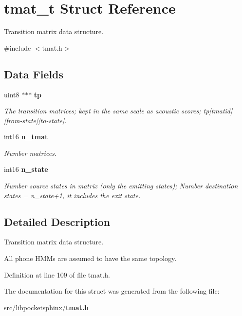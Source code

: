 \section{tmat\-\_\-t Struct Reference}
\label{structtmat__t}


Transition matrix data structure.  




{\ttfamily \#include $<$tmat.\-h$>$}

\subsection*{Data Fields}
\begin{DoxyCompactItemize}
\item 
uint8 $\ast$$\ast$$\ast$ {\bf tp}\label{structtmat__t_a9f518c96b30dab9efdb69bd779a7b5bf}

\begin{DoxyCompactList}\small\item\em The transition matrices; kept in the same scale as acoustic scores; tp[tmatid][from-\/state][to-\/state]. \end{DoxyCompactList}\item 
int16 {\bf n\-\_\-tmat}\label{structtmat__t_ada644af34d54256f1574870d5f7a6788}

\begin{DoxyCompactList}\small\item\em Number matrices. \end{DoxyCompactList}\item 
int16 {\bf n\-\_\-state}\label{structtmat__t_a3633c71659e30cf23bee1f7efb4b4805}

\begin{DoxyCompactList}\small\item\em Number source states in matrix (only the emitting states); Number destination states = n\-\_\-state+1, it includes the exit state. \end{DoxyCompactList}\end{DoxyCompactItemize}


\subsection{Detailed Description}
Transition matrix data structure. 

All phone H\-M\-Ms are assumed to have the same topology. 

Definition at line 109 of file tmat.\-h.



The documentation for this struct was generated from the following file\-:\begin{DoxyCompactItemize}
\item 
src/libpocketsphinx/{\bf tmat.\-h}\end{DoxyCompactItemize}
